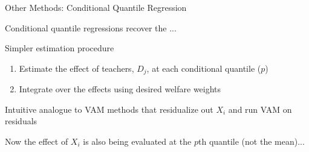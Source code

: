 \documentclass[t,aspectratio=169,11pt]{beamer}
\newenvironment{wideitemize}{\itemize\addtolength{\itemsep}{14pt}}{\enditemize}
\begin{document}
\begin{frame}{Other Methods: Conditional Quantile Regression}

\begin{wideitemize}

    \item Conditional quantile regressions recover the ... \citep{}
    
    \item Simpler estimation procedure
    \begin{enumerate}
        \item Estimate the effect of teachers, $D_j$, at each conditional quantile ($p$)
        \item Integrate over the effects using desired welfare weights
    \end{enumerate}

    \item Intuitive analogue to VAM methods that residualize out $X_i$ and run VAM on residuals
    
    \item Now the effect of $X_i$ is also being evaluated at the $p$th quantile (not the mean)...
    

\end{wideitemize}
\end{frame}

\end{document}
